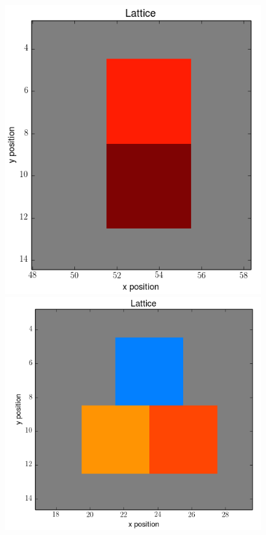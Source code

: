 \documentclass[12pt]{article}
\begin{document}
\begin{figure}[h]
	\includegraphics[scale=0.20]{img/2vert-start}
	\includegraphics[scale=0.20]{img/3ctc-start}

\end{figure}
\end{document}

